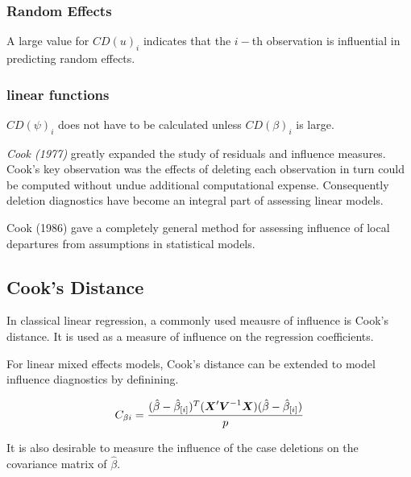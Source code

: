 \documentclass[12pt, a4paper]{article}
\begin{document}
\newpage
\subsubsection{Random Effects}

A large value for $CD(u)_i$ indicates that the $i-$th observation is influential in predicting random effects.

\subsubsection{linear functions}

$CD(\psi)_i$ does not have to be calculated unless $CD(\beta)_i$ is large.


%	
%	
\textit{Cook (1977)} greatly expanded the study of residuals and influence measures. Cook's key observation was the effects of deleting each observation in turn could be computed without undue additional computational expense. Consequently deletion diagnostics have become an integral part of assessing linear models.


Cook (1986) gave a completely general method for assessing influence of local departures from
assumptions in statistical models.


\subsection{Cook's Distance}%
In classical linear regression, a commonly used meausre of influence is Cook's distance. It is used as a measure of influence on the regression coefficients.

For linear mixed effects models, Cook's distance can be extended to model influence diagnostics by definining.

\[ C_{\beta i} = {(\hat{\beta} - \hat{\beta}_{[i]})^{T}(\boldsymbol{X}^{\prime}\boldsymbol{V}^{-1}\boldsymbol{X}) (\hat{\beta} - \hat{\beta}_{[i]}) \over p}\]

It is also desirable to measure the influence of the case deletions on the covariance matrix of $\hat{\beta}$.
\end{document}
